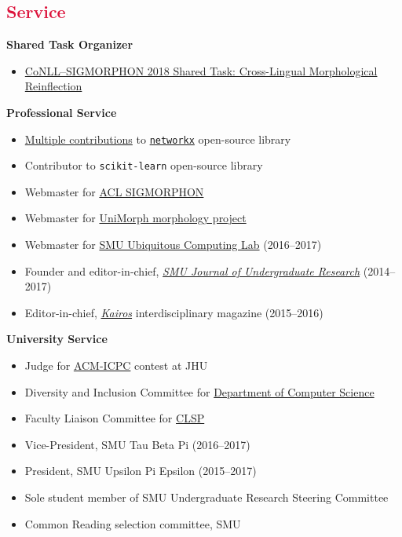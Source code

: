 \documentclass[margin, 10pt]{res} %
\let\oldsection\section
\renewcommand{\section}[1]{\oldsection{\textcolor{crimson}{#1}}}
\newcommand{\clsp}{\href{https://www.clsp.jhu.edu}{CLSP}}
\begin{document}
\begin{resume}
\section{Service}

\textbf{Shared Task Organizer}
\begin{itemize}
\item \href{https://sigmorphon.github.io/sharedtasks/2018/}{CoNLL--SIGMORPHON 2018 Shared Task: Cross-Lingual Morphological Reinflection}

\end{itemize}

\textbf{Professional Service}

\begin{itemize}[noitemsep]
\item \href{https://github.com/networkx/networkx/pulls?utf8=?&q=is\%3Apr+author\%3Aaryamccarthy+}{Multiple contributions} to \href{http://networkx.github.io}{\texttt{networkx}} open-source library
\item Contributor to \texttt{scikit-learn} open-source library
\item Webmaster for \href{https://sigmorphon.github.io}{ACL SIGMORPHON}
\item Webmaster for \href{https://unimorph.github.io}{UniMorph morphology project}
\item Webmaster for \href{http://ubicomp.lyle.smu.edu}{SMU Ubiquitous Computing Lab} (2016--2017)
\item Founder and editor-in-chief, \href{https://smuresearch.wordpress.com/journal/}{\emph{SMU Journal of Undergraduate Research}} (2014--2017)
\item Editor-in-chief, \href{https://smuresearch.wordpress.com/kairos/}{\emph{Kairos}} interdisciplinary magazine (2015--2016)
\end{itemize}


\textbf{University Service}

\begin{itemize}[noitemsep]
\item Judge for \href{https://en.wikipedia.org/wiki/ACM_International_Collegiate_Programming_Contest}{ACM-ICPC} contest at JHU
\item Diversity and Inclusion Committee for \href{https://www.cs.jhu.edu}{Department of Computer Science}
\item Faculty Liaison Committee for \clsp
\item Vice-President, SMU Tau Beta Pi (2016--2017)
\item President, SMU Upsilon Pi Epsilon (2015--2017)
\item Sole student member of SMU Undergraduate Research Steering Committee
\item Common Reading selection committee, SMU
\end{itemize}


\end{resume}
\end{document}

